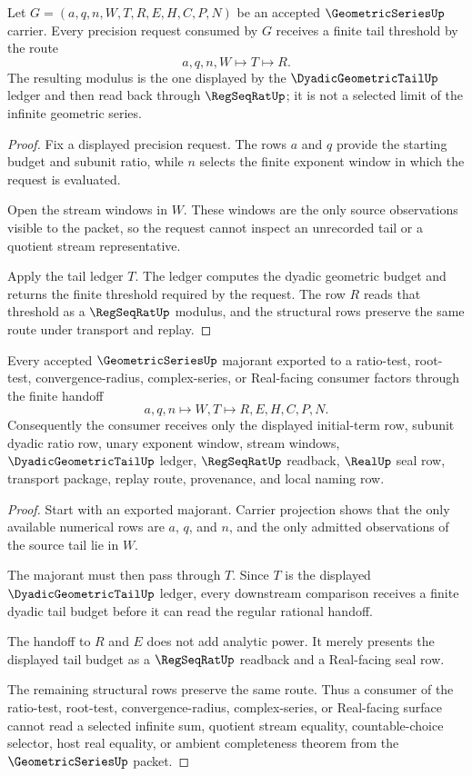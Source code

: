 \begin{theorem}
\label{thm:geometric-series-tail-modulus}
Let $G=(a,q,n,W,T,R,E,H,C,P,N)$ be an accepted $\GeometricSeriesUp$ carrier. Every precision request consumed by $G$ receives a finite tail threshold by the route
$$
a,q,n,W\longmapsto T\longmapsto R .
$$
The resulting modulus is the one displayed by the $\DyadicGeometricTailUp$ ledger and then read back through $\RegSeqRatUp$; it is not a selected limit of the infinite geometric series.
\end{theorem}
\begin{proof}
Fix a displayed precision request. The rows $a$ and $q$ provide the starting budget and subunit ratio, while $n$ selects the finite exponent window in which the request is evaluated.

Open the stream windows in $W$. These windows are the only source observations visible to the packet, so the request cannot inspect an unrecorded tail or a quotient stream representative.

Apply the tail ledger $T$. The ledger computes the dyadic geometric budget and returns the finite threshold required by the request. The row $R$ reads that threshold as a $\RegSeqRatUp$ modulus, and the structural rows preserve the same route under transport and replay.
\end{proof}

\begin{theorem}
\label{thm:geometric-series-majorant-handoff}
Every accepted $\GeometricSeriesUp$ majorant exported to a ratio-test, root-test, convergence-radius, complex-series, or Real-facing consumer factors through the finite handoff
$$
a,q,n\longmapsto W,T\longmapsto R,E,H,C,P,N .
$$
Consequently the consumer receives only the displayed initial-term row, subunit dyadic ratio row, unary exponent window, stream windows, $\DyadicGeometricTailUp$ ledger, $\RegSeqRatUp$ readback, $\RealUp$ seal row, transport package, replay route, provenance, and local naming row.
\end{theorem}
\begin{proof}
Start with an exported majorant. Carrier projection shows that the only available numerical rows are $a$, $q$, and $n$, and the only admitted observations of the source tail lie in $W$.

The majorant must then pass through $T$. Since $T$ is the displayed $\DyadicGeometricTailUp$ ledger, every downstream comparison receives a finite dyadic tail budget before it can read the regular rational handoff.

The handoff to $R$ and $E$ does not add analytic power. It merely presents the displayed tail budget as a $\RegSeqRatUp$ readback and a Real-facing seal row.

The remaining structural rows preserve the same route. Thus a consumer of the ratio-test, root-test, convergence-radius, complex-series, or Real-facing surface cannot read a selected infinite sum, quotient stream equality, countable-choice selector, host real equality, or ambient completeness theorem from the $\GeometricSeriesUp$ packet.
\end{proof}

